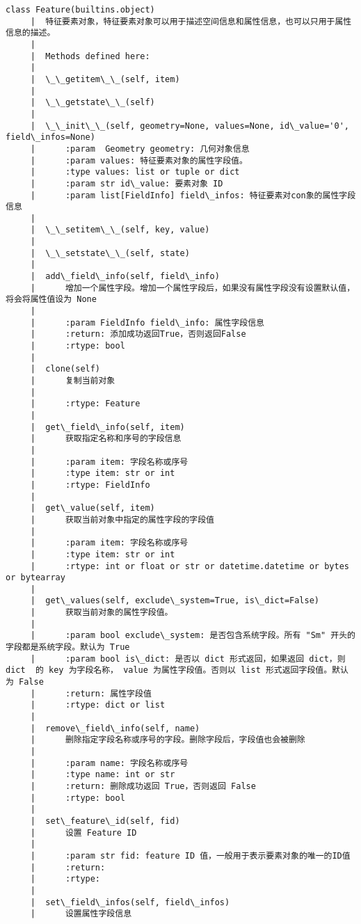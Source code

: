 \documentclass[11pt]{article}
\begin{document}
\begin{Verbatim}[commandchars=\\\{\}]
    class Feature(builtins.object)
     |  特征要素对象，特征要素对象可以用于描述空间信息和属性信息，也可以只用于属性信息的描述。
     |  
     |  Methods defined here:
     |  
     |  \_\_getitem\_\_(self, item)
     |  
     |  \_\_getstate\_\_(self)
     |  
     |  \_\_init\_\_(self, geometry=None, values=None, id\_value='0', field\_infos=None)
     |      :param  Geometry geometry: 几何对象信息
     |      :param values: 特征要素对象的属性字段值。
     |      :type values: list or tuple or dict
     |      :param str id\_value: 要素对象 ID
     |      :param list[FieldInfo] field\_infos: 特征要素对con象的属性字段信息
     |  
     |  \_\_setitem\_\_(self, key, value)
     |  
     |  \_\_setstate\_\_(self, state)
     |  
     |  add\_field\_info(self, field\_info)
     |      增加一个属性字段。增加一个属性字段后，如果没有属性字段没有设置默认值，将会将属性值设为 None
     |      
     |      :param FieldInfo field\_info: 属性字段信息
     |      :return: 添加成功返回True，否则返回False
     |      :rtype: bool
     |  
     |  clone(self)
     |      复制当前对象
     |      
     |      :rtype: Feature
     |  
     |  get\_field\_info(self, item)
     |      获取指定名称和序号的字段信息
     |      
     |      :param item: 字段名称或序号
     |      :type item: str or int
     |      :rtype: FieldInfo
     |  
     |  get\_value(self, item)
     |      获取当前对象中指定的属性字段的字段值
     |      
     |      :param item: 字段名称或序号
     |      :type item: str or int
     |      :rtype: int or float or str or datetime.datetime or bytes or bytearray
     |  
     |  get\_values(self, exclude\_system=True, is\_dict=False)
     |      获取当前对象的属性字段值。
     |      
     |      :param bool exclude\_system: 是否包含系统字段。所有 "Sm" 开头的字段都是系统字段。默认为 True
     |      :param bool is\_dict: 是否以 dict 形式返回，如果返回 dict，则 dict  的 key 为字段名称， value 为属性字段值。否则以 list 形式返回字段值。默认为 False
     |      :return: 属性字段值
     |      :rtype: dict or list
     |  
     |  remove\_field\_info(self, name)
     |      删除指定字段名称或序号的字段。删除字段后，字段值也会被删除
     |      
     |      :param name: 字段名称或序号
     |      :type name: int or str
     |      :return: 删除成功返回 True，否则返回 False
     |      :rtype: bool
     |  
     |  set\_feature\_id(self, fid)
     |      设置 Feature ID
     |      
     |      :param str fid: feature ID 值，一般用于表示要素对象的唯一的ID值
     |      :return:
     |      :rtype:
     |  
     |  set\_field\_infos(self, field\_infos)
     |      设置属性字段信息

\end{Verbatim}
\end{document}
